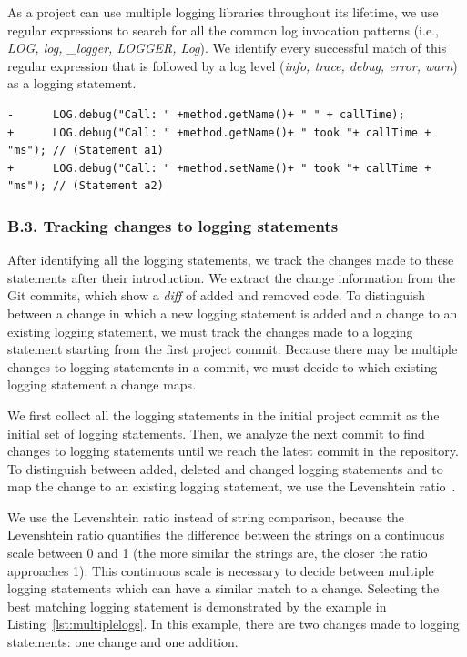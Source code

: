 As a project can use multiple logging libraries throughout its lifetime, we use regular expressions to search for all the common log invocation patterns (i.e., \emph{LOG, log, \_logger, LOGGER, Log}). We identify every successful match of this regular expression that is followed by a log level (\emph{info, trace, debug, error, warn}) as a logging statement.
\begin{lstlisting}[caption={Selecting the best matching logging statement}, label={lst:multiplelogs}, float=*]
-      LOG.debug("Call: " +method.getName()+ " " + callTime);
+      LOG.debug("Call: " +method.getName()+ " took "+ callTime + "ms"); // (Statement a1)
+      LOG.debug("Call: " +method.setName()+ " took "+ callTime + "ms"); // (Statement a2)
\end{lstlisting}

\subsubsection*{B.3. Tracking changes to logging statements}
After identifying all the logging statements, we track the changes made to these statements after their introduction. We extract the change information from the Git commits, which show a \emph{diff} of added and removed code. To distinguish between a change in which a new logging statement is added and a change to an existing logging statement, we must track the changes made to a logging statement starting from the first project commit. Because there may be multiple changes to logging statements in a commit, we must decide to which existing logging statement a change maps.

We first collect all the logging statements in the initial project commit as the initial set of logging statements. Then, we analyze the next commit to find changes to logging statements until we reach the latest commit in the repository. To distinguish between added, deleted and changed logging statements and to map the change to an existing logging statement, we use the Levenshtein ratio~\cite{levenshteinratio}. 

We use the Levenshtein ratio instead of string comparison, because the Levenshtein ratio quantifies the difference between the strings on a continuous scale between 0 and 1 (the more similar the strings are, the closer the ratio approaches 1). This continuous scale is necessary to decide between multiple logging statements which can have a similar match to a change. Selecting the best matching logging statement is demonstrated by the example in Listing~\ref{lst:multiplelogs}. In this example, there are two changes made to logging statements: one change and one addition. 

